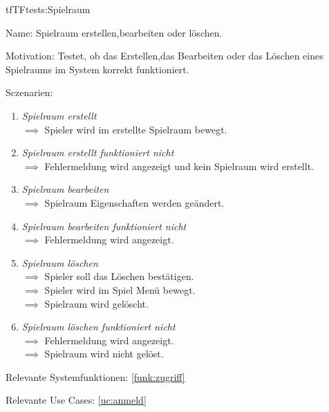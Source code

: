 \begin{description}[leftmargin=5em, style=sameline]

\begin{lhp}{tf}{TF}{tests:Spielraum}
	\item [Name:] Spielraum erstellen,bearbeiten oder löschen.
	\item [Motivation:] Testet, ob das Erstellen,das Bearbeiten oder das Löschen eines Spielraums im System korrekt funktioniert.
	\item [Sczenarien:] \hfill
		\begin{enumerate}
			\item \textit{Spielraum erstellt} \\ $\implies$ Spieler wird im erstellte Spielraum bewegt.
			\item \textit{Spielraum erstellt funktioniert nicht} \\ $\implies$ Fehlermeldung wird angezeigt und kein Spielraum wird erstellt.
			\item \textit{Spielraum bearbeiten} \\ $\implies$ Spielraum Eigenschaften werden geändert.
			\item \textit{Spielraum bearbeiten funktioniert nicht} \\ $\implies$ Fehlermeldung wird angezeigt.
			\item \textit{Spielraum löschen} \\ $\implies$ Spieler soll das Löschen bestätigen.
							         \\ $\implies$ Spieler wird im Spiel Menü bewegt.
\\ $\implies$ Spielraum wird gelöscht.
			\item \textit{Spielraum löschen funktioniert nicht} \\ $\implies$ Fehlermeldung wird angezeigt.
\\ $\implies$ Spielraum wird nicht gelöst.
		\end{enumerate}
	\item [Relevante Systemfunktionen:] \ref{funk:zugriff}
	\item [Relevante Use Cases:] \ref{uc:anmeld}
\end{lhp}

\end{description}

